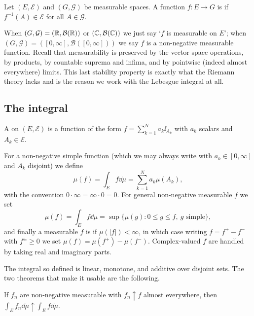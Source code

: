 \documentclass[a4paper]{scrartcl}
\begin{document}
\begin{definition}
	Let $(E, \mathcal{E})$ and $(G, \mathcal{G})$ be measurable spaces. A function $f : E \to G$ is  if $f^{-1}(A) \in \mathcal{E}$ for all $A \in \mathcal{G}$.
\end{definition}

When $(G, \mathcal{G}) = (\mathbb{R}, \mathcal{B}(\mathbb{R}))$ or $(\mathbb{C}, \mathcal{B}(\mathbb{C}))$ we just say `$f$ is measurable on $E$'; when $(G,\mathcal{G}) = ([0,\infty], \mathcal{B}([0,\infty]))$ we say $f$ is a non-negative measurable function. Recall that measurability is preserved by the vector space operations, by products, by countable suprema and infima, and by pointwise (indeed almost everywhere) limits. This last stability property is exactly what the Riemann theory lacks and is the reason we work with the Lebesgue integral at all.

\subsection{The integral}

\begin{definition}
	A  on $(E, \mathcal{E})$ is a function of the form $f = \sum_{k=1}^N a_k \ii_{A_k}$ with $a_k$ scalars and $A_k \in \mathcal{E}$.
\end{definition}

For a non-negative simple function (which we may always write with $a_k \in [0,\infty]$ and $A_k$ disjoint) we define
$$\mu(f) = \int_E f \dd\mu = \sum_{k=1}^N a_k \mu(A_k),$$
with the convention $0 \cdot \infty = \infty \cdot 0 = 0$. For general non-negative measurable $f$ we set
$$\mu(f) = \int_E f \dd \mu = \sup\{ \mu(g) : 0 \le g \le f, \ g \text{ simple}\},$$
and finally a measurable $f$ is  if $\mu(|f|) < \infty$, in which case writing $f = f^+ - f^-$ with $f^\pm \ge 0$ we set $\mu(f) = \mu(f^+) - \mu(f^-)$. Complex-valued $f$ are handled by taking real and imaginary parts.

The integral so defined is linear, monotone, and additive over disjoint sets. The two theorems that make it usable are the following.

\begin{theorem}\label{thm:mct}
	If $f_n$ are non-negative measurable with $f_n \uparrow f$ almost everywhere, then $\int_E f_n \dd\mu \uparrow \int_E f \dd \mu$.
\end{theorem}
\end{document}
